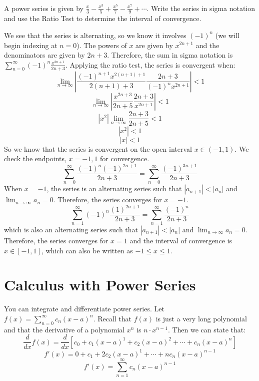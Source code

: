 \begin{Exercise} A power series is given by 
$\frac{x}{3} - \frac{x^3}{5} + \frac{x^5}{7} - \frac{x^7}{9} + \cdots$. Write 
the series in sigma notation and use the Ratio Test to determine the interval 
of convergence.
\end{Exercise}

\begin{Answer}[ref = radconv2]
We see that the series is alternating, so we know it involves $(-1)^n$ (we 
will begin indexing at $n = 0$). The powers of $x$ are given by $x^{2n+1}$ and 
the denominators are given by $2n + 3$. Therefore, the sum in sigma notation 
is $\sum_{n=0}^\infty (-1)^n \frac{x^{2n+1}}{2n+3}$. Applying the ratio test, 
the series is convergent when:
$$\lim_{n \to \infty} \left| \frac{(-1)^{n+1} x^{2(n+1)+1}}{2(n+1)+3} \frac{2n+
3}{(-1)^n x^{2n+1}} \right| < 1$$
$$\lim_{n \to \infty} \left| \frac{x^{2n+3}}{2n+5} \frac{2n+3}{x^{2n+1}} 
\right| < 1$$
$$\left| x^2 \right| \lim_{n \to \infty} \frac{2n+3}{2n+5} < 1$$
$$\left| x^2 \right| < 1$$
$$\left| x \right| < 1$$
So we know that the series is convergent on the open interval $x \in (-1, 1)$. 
We check the endpoints, $x = -1, 1$ for convergence. 
$$\sum_{n=0}^\infty \frac{(-1)^n (-1)^{2n+1}}{2n+3} = \sum_{n=0}^\infty \frac{
(-1)^{3n+1}}{2n+3}$$
When $x = -1$, the series is an alternating series such that $\left| a_{n+1} 
\right| < \left|a_n \right|$ and $\lim_{n \to \infty} a_n = 0$. Therefore, the 
series converges for $x = -1$.
$$\sum_{n=1}^\infty (-1)^n \frac{(1)^{2n+1}}{2n+3} = \sum_{n=1}^\infty \frac{
(-1)^n}{2n+3}$$
which is also an alternating series such that $\left| a_{n+1} \right| < \left| 
a_n \right|$ and $\lim_{n \to \infty} a_n = 0$. Therefore, the series 
converges for $x = 1$ and the interval of convergence is $x \in [-1, 1]$, 
which can also be written as $-1 \leq x \leq 1$. 
\end{Answer}

\section{Calculus with Power Series}
You can integrate and differentiate power series. Let $f(x) = \sum_{n=0}^\infty 
c_n (x-a)^n$. Recall that $f(x)$ is just a very long polynomial and that the 
derivative of a polynomial $x^n$ is $n \cdot x^{n-1}$. Then we can state that:
$$\frac{d}{dx}f(x) = \frac{d}{dx} \left[c_0 + c_1(x-a)^1 + c_2(x-a)^2 + \cdots 
+ c_n(x-a)^n \right]$$
$$f'(x) = 0 + c_1 + 2c_2(x-a)^1 + \cdots + n c_n(x-a)^{n-1}$$
$$f'(x) = \sum_{n=1}^\infty c_n(x-a)^{n-1}$$

